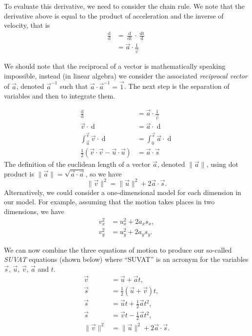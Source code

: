 To evaluate this derivative, we need to consider the chain rule. We note that the derivative above is equal to the product of acceleration and the inverse of velocity, that is
\begin{align*}
    \frac{\mathop{\mathrm{d}\vec{v}}}{\mathop{\mathrm{d}\vec{s}}} &= \frac{\mathop{\mathrm{d}\vec{v}}}{\mathop{\mathrm{d}t}} \cdot \frac{\mathop{\mathrm{d}t}}{\mathop{\mathrm{d}\vec{s}}} \\
    &= \vec{a} \cdot \frac{1}{\vec{v}}
\end{align*}

We should note that the reciprocal of a vector is mathematically speaking impossible, instead (in linear algebra) we consider the associated \textit{reciprocal vector} of $\vec{a}$, denoted $\vec{a}^{-1}$ such that $\vec{a} \cdot \vec{a}^{-1} = \vec{1}$. The next step is the separation of variables and then to integrate them. 

\begin{align*}
    \frac{\mathop{\mathrm{d}\vec{v}}}{\mathop{\mathrm{d}\vec{s}}} &= \vec{a} \cdot \frac{1}{\vec{v}} \\
    \vec{v} \cdot \mathop{\mathrm{d}\vec{v}} &= \vec{a} \cdot \mathop{\mathrm{d}\vec{s}} \\
    \int_{\vec{u}}^{\vec{v}} \vec{v} \cdot \mathop{\mathrm{d}\vec{v}} &= \int_0^{\vec{s}} \vec{a} \cdot \mathop{\mathrm{d}\vec{s}} \\
    \frac{1}{2}(\vec{v}\cdot \vec{v} - \vec{u} \cdot \vec{u}) &= \vec{a} \cdot \vec{s}
\end{align*}
The definition of the euclidean length of a vector $\vec{a}$, denoted $\| \vec{a} \|$, using dot product is $\| \vec{a} \| = \sqrt{\vec{a} \cdot \vec{a}}$, so we have 
\begin{equation}
    \label{eq:third-equation-of-motion}
    \| \vec{v} \|^2 = \| \vec{u} \|^2 + 2 \vec{a} \cdot \vec{s}.
\end{equation}
Alternatively, we could consider a one-dimensional model for each dimension in our model. For example, assuming that the motion takes places in two dimensions, we have
\begin{align*}
    v_x^2 &= u_x^2 + 2 a_x s_x, \\
    v_y^2 &= u_y^2 + 2 a_y s_y.
\end{align*}

We can now combine the three equations of motion to produce our so-called \textit{SUVAT} equations (shown below) where ``SUVAT'' is an acronym for the variables $\vec{s}$, $\vec{u}$, $\vec{v}$, $\vec{a}$ and $t$.
\begin{align}
    \vec{v} &= \vec{u} + \vec{a}t, \\
    \vec{s} &= \frac{1}{2}(\vec{u} + \vec{v})t, \\
    \vec{s} &= \vec{u}t + \frac{1}{2}\vec{a}t^2, \\
    \vec{s} &= \vec{v}t - \frac{1}{2}\vec{a}t^2, \\
    \| \vec{v} \|^2 &= \| \vec{u} \|^2 + 2\vec{a}\cdot \vec{s}.
\end{align}


